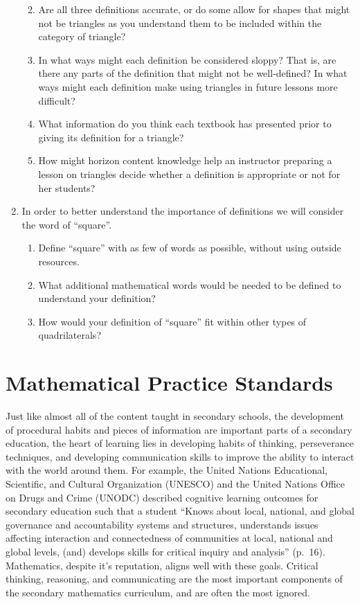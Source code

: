 \documentclass[
]{book}
\let\stdsection\section
\renewcommand\section{\newpage\stdsection}
\theoremstyle{definition}
\theoremstyle{definition}
\theoremstyle{definition}
\theoremstyle{definition}
\theoremstyle{remark}
\begin{document}
\begin{enumerate}
  \begin{enumerate}
  \def\labelenumii{\alph{enumii})}
  \item
    Are all three definitions accurate, or do some allow for shapes that might not be triangles as you understand them to be included within the category of triangle?
  \item
    In what ways might each definition be considered sloppy? That is, are there any parts of the definition that might not be well-defined? In what ways might each definition make using triangles in future lessons more difficult?
  \item
    What information do you think each textbook has presented prior to giving its definition for a triangle?
  \item
    How might horizon content knowledge help an instructor preparing a lesson on triangles decide whether a definition is appropriate or not for her students?
  \end{enumerate}
\item
  In order to better understand the importance of definitions we will consider the word of ``square''.

  \begin{enumerate}
  \def\labelenumii{\alph{enumii})}
  \item
    Define ``square'' with as few of words as possible, without using outside resources.
  \item
    What additional mathematical words would be needed to be defined to understand your definition?
  \item
    How would your definition of ``square'' fit within other types of quadrilaterals?
  \end{enumerate}
\end{enumerate}

\hypertarget{mathematical-practice-standards}{%
\section{Mathematical Practice Standards}\label{mathematical-practice-standards}}

Just like almost all of the content taught in secondary schools, the development of procedural habits and pieces of information are important parts of a secondary education, the heart of learning lies in developing habits of thinking, perseverance techniques, and developing communication skills to improve the ability to interact with the world around them. For example, the United Nations Educational, Scientific, and Cultural Organization (UNESCO) and the United Nations Office on Drugs and Crime (UNODC) \citeyearpar{UNESCO} described cognitive learning outcomes for secondary education such that a student ``Knows about local, national, and global governance and accountability systems and structures, understands issues affecting interaction and connectedness of communities at local, national and global levels, (and) develops skills for critical inquiry and analysis'' (p.~16). Mathematics, despite it's reputation, aligns well with these goals. Critical thinking, reasoning, and communicating are the most important components of the secondary mathematics curriculum, and are often the most ignored.
\end{document}
